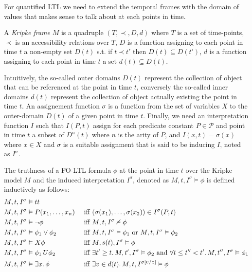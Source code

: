 For quantified LTL we need to extend the temporal frames with the domain of values that makes sense to talk about at
each points in time.

\begin{definition}
  A \emph{Kripke frame} $M$ is a quadruple $(T, \prec, D, d)$ where $T$ is a set of time-points, $\prec$ is an
  accessibility
  relations over $T$, $D$ is a function assigning to each point in time $t$ a non-empty set $D(t)$ s.t. if $t \prec t'$
  then $D(t) \subseteq D(t')$, $d$ is a function assigning to each point in time $t$ a set $d(t) \subseteq D(t)$.
\end{definition}
Intuitively, the so-called outer domains $D(t)$ represent the collection of object that can be referenced at the point
in time $t$, conversely the so-called inner domains $d(t)$ represent the collection of object actually existing the
point in time $t$. An assignement function $\sigma$ is a function from the set of variables $X$ to the outer-domain
$D(t)$ of a given point in time $t$. Finally, we need an interpretation function $I$ such that $I(P, t)$ assign for each
predicate constant $P \in \mathcal{P}$ and point in time $t$ a subset of $D^n(t)$ where $n$ is the arity of $P$, and
$I(x, t) = \sigma(x)$ where $x \in X$ and $\sigma$ is a suitable assignment that is said to be inducing $I$, noted as
$I^\sigma$.

\begin{definition}
  The truthness of a FO-LTL formula $\phi$ at the point in time $t$ over the Kripke model $M$ and the induced
  interpretation $I^\sigma$, denoted as $M, t, I^\sigma \vDash \phi$ is defined inductively as follows:
  \begin{align*}
    M, t, I^\sigma &\vDash tt && \\
    M, t, I^\sigma &\vDash P(x_1, \ldots, x_n) &&\text{ iff } (\sigma(x_1), \ldots, \sigma(x_2)) \in I^\sigma(P, t) \\
    M, t, I^\sigma &\vDash \neg\phi &&\text{ iff } M, t, I^\sigma \nvDash \phi \\
    M, t, I^\sigma &\vDash \phi_1 \lor \phi_2 &&\text{ iff } M, t, I^\sigma \vDash \phi_1 \text{ or } M, t, I^\sigma
      \vDash \phi_2 \\
    M, t, I^\sigma &\vDash X{\phi} &&\text{ iff } M, s(t), I^\sigma \vDash \phi \\
    M, t, I^\sigma &\vDash {\phi_1}\,U {\phi_2} &&\text{ iff } \exists t' \geq t \ldotp M, t', I^\sigma \vDash \phi_2
      \text{ and } \forall t \leq t'' < t' \ldotp M, t'', I^\sigma \vDash \phi_1 \\
    M, t, I^\sigma &\vDash \exists {x} \ldotp {\phi} &&\text{ iff } \exists {v \in d(t)} \ldotp {M, t, I^{\sigma[v/x]} \vDash \phi} \\
  \end{align*}
\end{definition}


